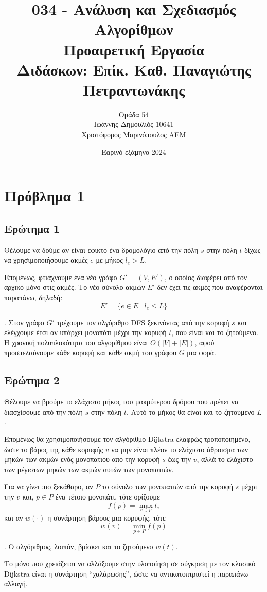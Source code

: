 \documentclass[12pt]{article}
\title{\vspace{-2cm}034 - Ανάλυση και Σχεδιασμός Αλγορίθμων\\ 
         Προαιρετική Εργασία \\
         \large Διδάσκων: Επίκ. Καθ. Παναγιώτης Πετραντωνάκης}
\author{Ομάδα 54 \\
        Ιωάννης Δημουλιός 10641 \\
        Χριστόφορος Μαρινόπουλος ΑΕΜ}
\date{Εαρινό εξάμηνο 2024}
\begin{document}
\maketitle

\section*{Πρόβλημα 1}
\subsection*{Ερώτημα 1}
Θέλουμε να δούμε αν είναι εφικτό ένα δρομολόγιο από την πόλη \(s\) στην πόλη \(t\) δίχως να χρησιμοποιήσουμε ακμές \(e\) με μήκος \(l_e > L\). 

Επομένως, φτιάχνουμε ένα νέο γράφο \(G' = (V, E')\), ο οποίος διαφέρει από τον αρχικό μόνο στις ακμές. Το νέο σύνολο ακμών \(E'\) δεν έχει τις ακμές που αναφέρονται παραπάνω, δηλαδή: 
\[
    E' = \{e \in E \mid l_e \leq L\}
\]

. Στον γράφο \(G'\) τρέχουμε τον αλγόριθμο DFS ξεκινόντας από την κορυφή \(s\) και ελέγχουμε έτσι αν υπάρχει μονοπάτι μέχρι την κορυφή \(t\), που είναι και το ζητούμενο. 
Η χρονική πολυπλοκότητα του αλγορίθμου είναι \(O(|V| + |E|)\), αφού προσπελαύνουμε κάθε κορυφή και κάθε ακμή του γράφου \(G\) μια φορά. \hfill \blacksquare

\subsection*{Ερώτημα 2}
Θέλουμε να βρούμε το ελάχιστο μήκος του μακρύτερου δρόμου που πρέπει να διασχίσουμε από την πόλη \(s\) στην πόλη \(t\). Αυτό το μήκος θα είναι και το ζητούμενο \(L\). 

Επομένως θα χρησιμοποιήσουμε τον αλγόριθμο Dijkstra ελαφρώς τροποποιημένο, ώστε το βάρος της κάθε κορυφής \(v\) να μην είναι πλέον το ελάχιστο άθροισμα των μηκών των ακμών ενός μονοπατιού από την κορυφή \(s\) έως την \(v\), αλλά το ελάχιστο των μέγιστων μηκών των ακμών αυτών των μονοπατιών. 

Για να γίνει πιο ξεκάθαρο, αν \(P\) το σύνολο των μονοπατιών από την κορυφή \(s\) μέχρι την \(v\) και, \(p \in P\) ένα τέτοιο μονοπάτι, τότε ορίζουμε
\[
    f(p) = \max_{e\in p} l_e
\]
και αν \(w(\cdot)\) η συνάρτηση βάρους μια κορυφής, τότε 
\[
    w(v) = \min_{p\in P} f(p)
\]

. O αλγόριθμος, λοιπόν, βρίσκει και το ζητούμενο \(w(t)\).

Το μόνο που χρειάζεται να αλλάξουμε στην υλοποίηση σε σύγκριση με τον κλασικό Dijkstra είναι η συνάρτηση ``χαλάρωσης'', ώστε να αντικατοπτριστεί η παραπάνω αλλαγή. 
\end{document}
